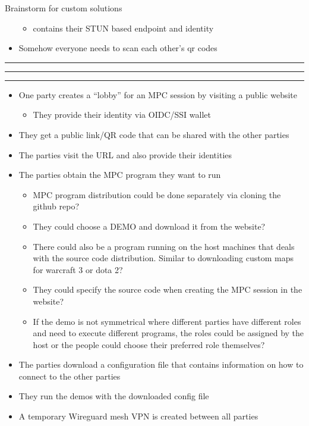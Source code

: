 \begin{frame}{Brainstorm for custom solutions}
\begin{itemize}
  \begin{itemize}
  \tightlist
  \item
    contains their STUN based endpoint and identity
  \end{itemize}
\item
  Somehow everyone needs to scan each other's qr codes
\end{itemize}

\begin{center}\rule{0.5\linewidth}{0.5pt}\end{center}

\begin{center}\rule{0.5\linewidth}{0.5pt}\end{center}

\begin{center}\rule{0.5\linewidth}{0.5pt}\end{center}

\begin{itemize}
\tightlist
\item
  One party creates a ``lobby'' for an MPC session by visiting a public
  website

  \begin{itemize}
  \tightlist
  \item
    They provide their identity via OIDC/SSI wallet
  \end{itemize}
\item
  They get a public link/QR code that can be shared with the other
  parties
\item
  The parties visit the URL and also provide their identities
\item
  The parties obtain the MPC program they want to run

  \begin{itemize}
  \tightlist
  \item
    MPC program distribution could be done separately via cloning the
    github repo?
  \item
    They could choose a DEMO and download it from the website?
  \item
    There could also be a program running on the host machines that
    deals with the source code distribution. Similar to downloading
    custom maps for warcraft 3 or dota 2?
  \item
    They could specify the source code when creating the MPC session in
    the website?
  \item
    If the demo is not symmetrical where different parties have
    different roles and need to execute different programs, the roles
    could be assigned by the host or the people could choose their
    preferred role themselves?
  \end{itemize}
\item
  The parties download a configuration file that contains information on
  how to connect to the other parties
\item
  They run the demos with the downloaded config file
\item
  A temporary Wireguard mesh VPN is created between all parties
\end{itemize}
\end{frame}

